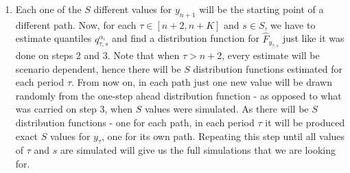 \begin{enumerate}
\item Each one of the $S$ different values for $y_{n+1}$ will be the starting point of a different path. Now, for each $\tau \in [n+2,n+K]$ and $s \in S$, we have to estimate quantiles $q_{\tau,s}^{\alpha_i}$ and find a distribution function for $\hat{F}_{y_{\tau,s}}$ just like it was done on steps 2 and 3.
Note that when $\tau > n+2$, every estimate will be scenario dependent, hence there will be $S$ distribution functions estimated for each period $\tau$. From now on, in each path just one new value will be drawn randomly from the one-step ahead distribution function - as opposed to what was carried on step 3, when $S$ values were simulated. As there will be $S$ distribution functions - one for each path, in each period $\tau$ it will be produced exact $S$ values for $y_\tau$, one for its own path. Repeating this step until all values of $\tau$ and $s$ are simulated will give us the full simulations that we are looking for.
\end{enumerate}


